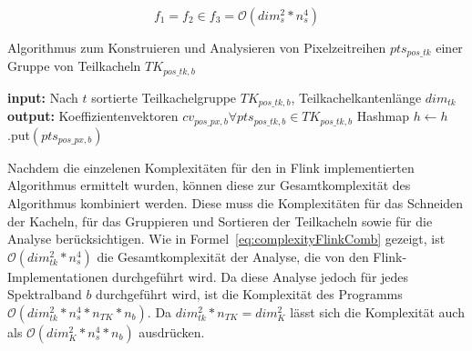 \begin{equation} \label{eq:complexityJavaRegressionComb}
f_1 = f_2 \in f_3 = \mathcal{O}(dim_{s}^2 * n_{s}^4)
\end{equation}

\begin{algorithm}[H]
\small
\caption{Algorithmus zum Konstruieren und Analysieren von Pixelzeitreihen  $pts_{pos\_tk}$ einer Gruppe von Teilkacheln $TK_{pos\_tk, b}$}
\label{alg:regressionAlgorithm}
\begin{algorithmic}[1]
	\State \textbf{input:} Nach $t$ sortierte Teilkachelgruppe $TK_{pos\_tk, b}$, Teilkachelkantenlänge $dim_{tk}$ 
	\State \textbf{output:} Koeffizientenvektoren $cv_{pos\_px, b} \forall pts_{pos\_tk, b} \in TK_{pos\_tk, b}$
	  \label{alg:constructPTS}
        		  \label{alg:iterY1}
			\State Hashmap $h \leftarrow h$.put$(pts_{pos\_px, b})$  
		\EndFor
	\EndFor
	  \label{alg:iterTK}
		  \label{alg:iterX1}
        			  \label{alg:iterY1}
				  \label{alg:endIterTK}
			\EndFor
		\EndFor
	\EndFor
	  \label{alg:iterPTSJava}
		  \label{alg:defineSVR}
		  \label{alg:normalizeY}
		  \label{alg:constructSVR}
		  \label{alg:executeRegression}
	\EndFor
\EndFunction
\end{algorithmic}
\end{algorithm}

Nachdem die einzelenen Komplexitäten für den in Flink implementierten Algorithmus ermittelt wurden, können diese zur Gesamtkomplexität des Algorithmus kombiniert werden. Diese muss die Komplexitäten für das Schneiden der Kacheln, für das Gruppieren und Sortieren der Teilkacheln sowie für die Analyse berücksichtigen. Wie in Formel~\ref{eq:complexityFlinkComb} gezeigt, ist $\mathcal{O}(dim_{tk}^2 * n_s^4)$ die Gesamtkomplexität der Analyse, die von den Flink-Implementationen durchgeführt wird. Da diese Analyse jedoch für jedes Spektralband $b$ durchgeführt wird, ist die Komplexität des Programms $\mathcal{O}(dim_{tk}^2 * n_s^4 * n_{TK} * n_b)$. Da $dim_{tk}^2 * n_{TK} = dim_{K}^2$ lässt sich die Komplexität auch als $\mathcal{O}(dim_{K}^2 * n_s^4 * n_b)$ ausdrücken.

